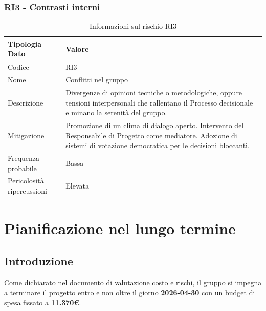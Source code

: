\documentclass[a4paper,12pt]{article}
\begin{document}
\subsubsection{RI3 - Contrasti interni}
\begin{table}[H]
    \centering
    \renewcommand{\arraystretch}{1.4}
    \begin{tabularx}{\textwidth}{|L|Z|}
        \hline
        \textbf{Tipologia Dato} & \textbf{Valore} \\
        \hline
        Codice & RI3 \\
        \hline
        Nome & Conflitti nel gruppo \\
        \hline
        Descrizione & Divergenze di opinioni tecniche o metodologiche, oppure tensioni interpersonali che rallentano il Processo decisionale e minano la serenità del gruppo. \\
        \hline
        Mitigazione & Promozione di un clima di dialogo aperto. Intervento del Responsabile di Progetto come mediatore. Adozione di sistemi di votazione democratica per le decisioni bloccanti. \\
        \hline
        Frequenza probabile & Bassa \\
        \hline
        Pericolosità ripercussioni & Elevata \\
        \hline
    \end{tabularx}
    \caption{Informazioni sul rischio RI3}
    \label{tab:RI3}
\end{table}

\section{Pianificazione nel lungo termine}\label{sec:pianificazione_lungo_termine}

\subsection{Introduzione}
Come dichiarato nel documento di \href{https://swe-bitbybit.github.io/SWE-docs/docs/candidatura/valutazione_costi_rischi/valutazione_costi_rischi.pdf}{valutazione costo e rischi}, il gruppo si impegna a terminare il progetto entro e non oltre il giorno \textbf{2026-04-30} con un budget di spesa fissato a \textbf{11.370\euro}.
\end{document}
